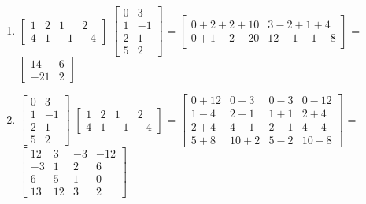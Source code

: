 \documentclass{article}
\begin{document}
\begin{enumerate}[label=(\alph*)]
		\item $\begin{bmatrix} 1 & 2 & 1 & 2 \\ 4 & 1 & -1 & -4 \end{bmatrix}$ $\begin{bmatrix} 0 & 3 \\ 1 & -1 \\ 2 & 1 \\ 5 & 2 \end{bmatrix}$
					= $\begin{bmatrix} 0 + 2 + 2 + 10 & 3 - 2 + 1 + 4 \\ 0 + 1 - 2 - 20 & 12 - 1 -1 - 8 \end{bmatrix}$ 
					= $\begin{bmatrix} 14 & 6 \\ -21 & 2 \end{bmatrix}$ 
		\item $\begin{bmatrix} 0 & 3 \\ 1 & -1 \\ 2 & 1 \\ 5 & 2 \end{bmatrix}$ $\begin{bmatrix} 1 & 2 & 1 & 2 \\ 4 & 1 & -1 & -4 \end{bmatrix}$
			= $\begin{bmatrix} 0 + 12 & 0 + 3 & 0 - 3 & 0 - 12 \\ 1 - 4 & 2 - 1 & 1 + 1 & 2 + 4 \\ 2 + 4 & 4 + 1 & 2 - 1 & 4 - 4 \\ 5 + 8 & 10 + 2 & 5 - 2 & 10 - 8 \end{bmatrix}$
			= $\begin{bmatrix} 12 & 3 & -3 & -12 \\ -3 & 1 & 2 & 6 \\ 6 & 5 & 1 & 0 \\ 13 & 12 & 3 & 2 \end{bmatrix}$
	\end{enumerate}
\clearpage
\end{document}
